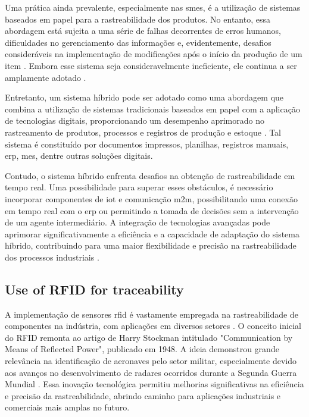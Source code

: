 Uma prática ainda prevalente, especialmente nas \acrfull{smes}\cite{ZHONG2013}, é a utilização de sistemas baseados em papel para a rastreabilidade dos produtos. No entanto, essa abordagem está sujeita a uma série de falhas decorrentes de erros humanos, dificuldades no gerenciamento das informações e, evidentemente, desafios consideráveis na implementação de modificações após o início da produção de um item \cite{Qu2012-hw}. Embora esse sistema seja consideravelmente ineficiente, ele continua a ser amplamente adotado \cite{ZHONG2013}.

Entretanto, um sistema híbrido pode ser adotado como uma abordagem que combina a utilização de sistemas tradicionais baseados em papel com a aplicação de tecnologias digitais, proporcionando um desempenho aprimorado no rastreamento de produtos, processos e registros de produção e estoque \cite{Qu2012-hw, ZHONG2013, Gilchrist2016}. Tal sistema é constituído por documentos impressos, planilhas, registros manuais, \acrshort{erp}, \acrshort{mes}, dentre outras soluções digitais.

Contudo, o sistema híbrido enfrenta desafios na obtenção de rastreabilidade em tempo real. Uma possibilidade para superar esses obstáculos, é necessário incorporar componentes de \acrfull{iot} e comunicação \acrshort{m2m}, possibilitando uma conexão em tempo real com o \acrshort{erp} ou permitindo a tomada de decisões sem a intervenção de um agente intermediário. A integração de tecnologias avançadas pode aprimorar significativamente a eficiência e a capacidade de adaptação do sistema híbrido, contribuindo para uma maior flexibilidade e precisão na rastreabilidade dos processos industriais \cite{Gilchrist2016}.

\subsection{Use of RFID for traceability}\label{RFIDtraceability}

A implementação de sensores \acrfull{rfid} é vastamente empregada na rastreabilidade de componentes na indústria, com aplicações em diversos setores \cite{ZHONG2013, Qu2012-hw, Anssens2011, Engelhardt2012, Rida2007}. O conceito inicial do RFID remonta ao artigo de Harry Stockman intitulado "Communication by Means of Reflected Power", publicado em 1948. A ideia demonstrou grande relevância na identificação de aeronaves pelo setor militar, especialmente devido aos avanços no desenvolvimento de radares ocorridos durante a Segunda Guerra Mundial \cite{Landt2005}. Essa inovação tecnológica permitiu melhorias significativas na eficiência e precisão da rastreabilidade, abrindo caminho para aplicações industriais e comerciais mais amplas no futuro.

